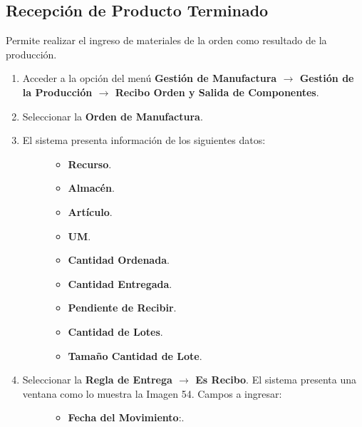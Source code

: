 \documentclass[letterpaper,10pt,spanish]{sphinxmanual}
\begin{document}
\subsection{Recepción de Producto Terminado}
\label{manufactura-operaciones:recepcion-de-producto-terminado}
Permite realizar el ingreso de materiales de la orden como resultado de la producción.
\begin{enumerate}
\item {} 
Acceder a la opción del menú \textbf{Gestión de Manufactura \(\rightarrow\) Gestión de la Producción \(\rightarrow\) Recibo Orden y Salida de Componentes}.

\item {} 
Seleccionar la \textbf{Orden de Manufactura}.

\item {} \begin{description}
\item[{El sistema presenta información de los siguientes datos:}] \leavevmode\begin{itemize}
\item {} 
\textbf{Recurso}.

\item {} 
\textbf{Almacén}.

\item {} 
\textbf{Artículo}.

\item {} 
\textbf{UM}.

\item {} 
\textbf{Cantidad Ordenada}.

\item {} 
\textbf{Cantidad Entregada}.

\item {} 
\textbf{Pendiente de Recibir}.

\item {} 
\textbf{Cantidad de Lotes}.

\item {} 
\textbf{Tamaño Cantidad de Lote}.

\end{itemize}

\end{description}

\item {} \begin{description}
\item[{Seleccionar la \textbf{Regla de Entrega \(\rightarrow\) Es Recibo}. El sistema presenta una ventana como lo muestra la Imagen 54. Campos a ingresar:}] \leavevmode\begin{itemize}
\item {} 
\textbf{Fecha del Movimiento}:.


\end{itemize}
\end{description}
\end{enumerate}
\end{document}
